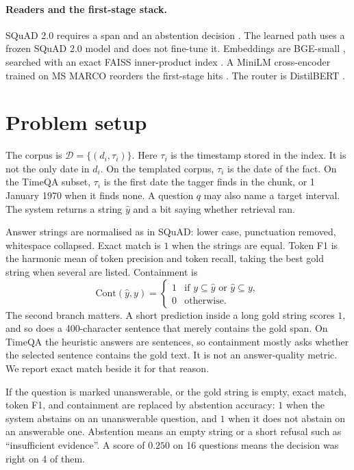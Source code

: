 \documentclass[11pt,letterpaper]{article}
\begin{document}
\paragraph{Readers and the first-stage stack.}
SQuAD 2.0 requires a span and an abstention decision \cite{rajpurkar2018squad2}.
The learned path uses a frozen SQuAD 2.0 model and does not fine-tune it.
Embeddings are BGE-small \cite{xiao2024cpack}, searched with an exact FAISS inner-product index \cite{johnson2019faiss}.
A MiniLM cross-encoder trained on MS MARCO reorders the first-stage hits \cite{wang2020minilm,nguyen2016msmarco,reimers2019sbert}.
The router is DistilBERT \cite{sanh2019distilbert,devlin2019bert}.

\section{Problem setup}
\label{sec:setup}

The corpus is $\mathcal{D}=\{(d_i,\tau_i)\}$.
Here $\tau_i$ is the timestamp stored in the index.
It is not the only date in $d_i$.
On the templated corpus, $\tau_i$ is the date of the fact.
On the TimeQA subset, $\tau_i$ is the first date the tagger finds in the chunk, or 1 January 1970 when it finds none.
A question $q$ may also name a target interval.
The system returns a string $\hat{y}$ and a bit saying whether retrieval ran.

Answer strings are normalised as in SQuAD: lower case, punctuation removed, whitespace collapsed.
Exact match is $1$ when the strings are equal.
Token F1 is the harmonic mean of token precision and token recall, taking the best gold string when several are listed.
Containment is
\begin{equation}
\mathrm{Cont}(\hat{y}, y) =
\begin{cases}
1 & \text{if } y \subseteq \hat{y} \text{ or } \hat{y} \subseteq y,\\
0 & \text{otherwise.}
\end{cases}
\end{equation}
The second branch matters.
A short prediction inside a long gold string scores $1$, and so does a 400-character sentence that merely contains the gold span.
On TimeQA the heuristic answers are sentences, so containment mostly asks whether the selected sentence contains the gold text.
It is not an answer-quality metric.
We report exact match beside it for that reason.

If the question is marked unanswerable, or the gold string is empty, exact match, token F1, and containment are replaced by abstention accuracy:
$1$ when the system abstains on an unanswerable question, and $1$ when it does not abstain on an answerable one.
Abstention means an empty string or a short refusal such as ``insufficient evidence''.
A score of $0.250$ on 16 questions means the decision was right on 4 of them.
\end{document}
